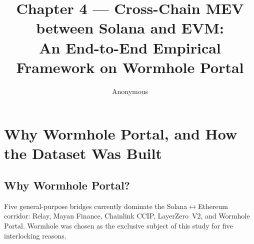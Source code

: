 \documentclass[sigconf,nonacm,10pt]{acmart}
\title{Chapter 4 --- Cross-Chain MEV between Solana and EVM:\\ An End-to-End Empirical Framework on Wormhole Portal}
\author{Anonymous}
\affiliation{\institution{-}\country{-}}
\begin{document}
\maketitle



\section{Why Wormhole Portal, and How the Dataset Was Built}
\label{sec:ch4-data}

\subsection{Why Wormhole Portal?}

Five general-purpose bridges currently dominate the Solana$\leftrightarrow$Ethereum
corridor: Relay, Mayan Finance, Chainlink CCIP, LayerZero~V2, and Wormhole
Portal. Wormhole was chosen as the exclusive subject of this study for five
interlocking reasons.
\end{document}

